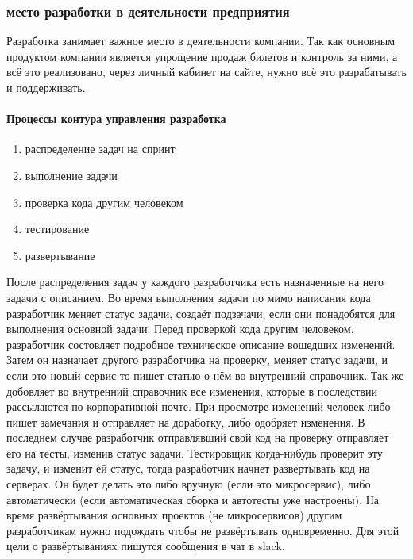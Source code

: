 \documentclass{article}
\begin{document}
\subsubsection{место разработки в деятельности предприятия}

Разработка занимает важное место в деятельности компании.
Так как основным продуктом компании является упрощение продаж билетов и контроль
за ними, а всё это реализовано, через личный кабинет на сайте, нужно всё это разрабатывать
и поддерживать.

\paragraph{Процессы контура управления разработка \cite{wiki}}
\begin{enumerate}
    \item{распределение задач на спринт}
    \item{выполнение задачи}
    \item{проверка кода другим человеком}
    \item{тестирование}
    \item{развертывание}
\end{enumerate}

После распределения задач у каждого разработчика есть назначенные на него задачи с описанием.
Во время выполнения задачи по мимо написания кода разработчик меняет статус задачи,
создаёт подзачачи, если они понадобятся для выполнения основной задачи.
Перед проверкой кода другим человеком, разработчик состовляет подробное техническое описание
вошедших изменений. Затем он назначает другого разработчика на проверку,
меняет статус задачи, и если это новый сервис то пишет статью о нём во внутренний справочник.
Так же добовляет во внутренний справочник все изменения,
которые в последствии рассылаются по корпоративной почте.
При просмотре изменений человек либо пишет замечания и отправляет на доработку,
либо одобряет изменения. В последнем случае разработчик отправлявший свой код на проверку
отправляет его на тесты, изменив статус задачи. Тестировщик когда-нибудь проверит эту задачу,
и изменит ей статус, тогда разработчик начнет развертывать код на серверах.
Он будет делать это либо вручную (если это микросервис), 
либо автоматически (если автоматическая сборка и автотесты уже настроены).
На время развёртывания основных проектов (не микросервисов) другим разработчикам нужно подождать
чтобы не развёртывать одновременно. Для этой цели о развёртываниях пишутся сообщения в чат в slack.
\cite{wiki}
\end{document}
